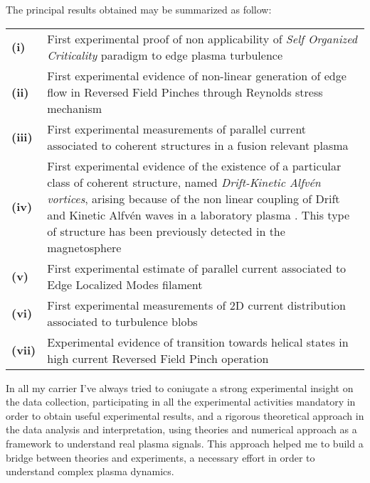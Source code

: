 The principal results obtained may be summarized as
follow:
\begin{longtable}{>{\bfseries}l p{17cm}}
(i) &  First experimental proof of non applicability of \emph{Self
    Organized Criticality} paradigm to edge plasma
  turbulence \parencite{Spada:2001p3574,Antoni:2001p3221} \\
(ii) &  First experimental evidence of non-linear generation of edge
  flow in Reversed Field Pinches through Reynolds stress
  mechanism \parencite{Vianello:2005p1976,Vianello:2005p2671} \\
(iii) & First experimental measurements of parallel current associated
  to coherent structures in a fusion relevant plasma \parencite{Spolaore:2009p4115} \\
(iv) & First experimental evidence of the existence of a particular 
  class of coherent structure, named \emph{Drift-Kinetic Alfv\'en
    vortices}, arising because of the non linear coupling of Drift and
  Kinetic Alfv\'en waves in a laboratory plasma \parencite{Vianello:2010p4670}. This type of structure has been
  previously detected in the magnetosphere \\
(v) &  First experimental estimate of parallel current associated to
  Edge Localized Modes filament \parencite{PhysRevLett.106.125002} \\
(vi) & First experimental measurements of 2D current distribution
associated to turbulence blobs \parencite{Furno:2011cs} \\
(vii) & Experimental evidence of transition towards helical states in
high current Reversed Field Pinch
operation \parencite{Lorenzini:2009p4248} \\
\end{longtable}

In all my carrier I've always tried to coniugate a strong experimental
insight on the data collection, participating in all the experimental
activities mandatory in order to obtain useful experimental results, and a rigorous theoretical approach in
the data analysis and interpretation, using theories and numerical
approach as a framework to understand real plasma signals. This
approach helped me to build a bridge between theories and experiments,
a necessary effort in order to understand complex plasma dynamics.
